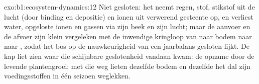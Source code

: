 \begin{solution}{exo:b1:ecosystem-dynamics:12}
Niet gesloten: het neemt regen, stof, stikstof uit de lucht (door binding en
depositie) en ionen uit verwerend gesteente op, en verliest water, opgeloste
ionen en gassen via zijn beek en zijn lucht; maar de aanvoer en de afvoer
zijn klein vergeleken met de inwendige kringloop van  naar bodem
naar  naar , zodat het bos op de nauwkeurigheid van een jaarbalans
gesloten lijkt. De kap liet zien waar die schijnbare geslotenheid vandaan
kwam: de opname door de levende plantengroei; met die weg lieten dezelfde
bodem en dezelfde  het dal zijn voedingsstoffen in één seizoen
weglekken.
\end{solution}

